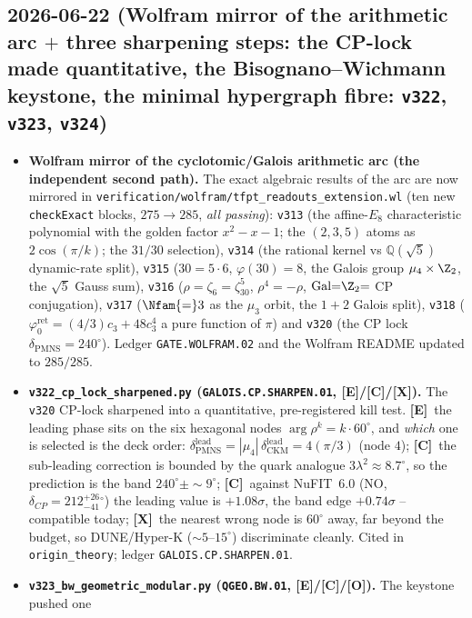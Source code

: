 \documentclass[11pt]{article}
\providecommand{\mE}{\textbf{[E]}}\providecommand{\mC}{\textbf{[C]}}
\providecommand{\mO}{\textbf{[O]}}\providecommand{\mX}{\textbf{[X]}}
\providecommand{\cthree}{c_3}\providecommand{\phiz}{\varphi_0^{\mathrm{ret}}}
\begin{document}
\subsection*{2026-06-22 (Wolfram mirror of the arithmetic arc $+$ three sharpening steps: the CP-lock made quantitative, the Bisognano--Wichmann keystone, the minimal hypergraph fibre: \texttt{v322}, \texttt{v323}, \texttt{v324})}
\begin{itemize}
\item \textbf{Wolfram mirror of the cyclotomic/Galois arithmetic arc (the independent second path).} The exact
  algebraic results of the arc are now mirrored in \texttt{verification/wolfram/tfpt\_readouts\_extension.wl} (ten new
  \texttt{checkExact} blocks, $275\to285$, \emph{all passing}): \texttt{v313} (the affine-$E_8$ characteristic
  polynomial with the golden factor $x^2{-}x{-}1$; the $(2,3,5)$ atoms as
  $2\cos(\pi/k)$; the $31/30$ selection), \texttt{v314} (the rational kernel vs $\mathbb Q(\sqrt5)$
  dynamic-rate split), \texttt{v315} ($30{=}5{\cdot}6$, $\varphi(30){=}8$, the Galois group $\mu_4\times\Z_2$, the
  $\sqrt5$ Gauss sum), \texttt{v316} ($\rho{=}\zeta_6{=}\zeta_{30}^5$, $\rho^4{=}-\rho$, $\mathrm{Gal}{=}\Z_2{=}$ CP
  conjugation), \texttt{v317} ($\Nfam{=}3$ as the $\mu_3$ orbit, the $1{+}2$ Galois split), \texttt{v318}
  ($\phiz{=}(4/3)\cthree{+}48\cthree^4$ a pure function of $\pi$) and \texttt{v320} (the CP lock
  $\delta_{\mathrm{PMNS}}{=}240^\circ$). Ledger \texttt{GATE.WOLFRAM.02} and the Wolfram README updated to $285/285$.
\item \textbf{\texttt{v322\_cp\_lock\_sharpened.py} (\texttt{GALOIS.CP.SHARPEN.01}, \mE/\mC/\mX).} The \texttt{v320}
  CP-lock sharpened into a quantitative, pre-registered kill test. \mE\ the leading phase sits on the six hexagonal
  nodes $\arg\rho^k{=}k\cdot60^\circ$, and \emph{which} one is selected is the deck order:
  $\delta_{\mathrm{PMNS}}^{\mathrm{lead}}{=}|\mu_4|\,\delta_{\mathrm{CKM}}^{\mathrm{lead}}{=}4(\pi/3)$ (node $4$);
  \mC\ the sub-leading correction is bounded by the quark analogue $3\lambda^2\approx8.7^\circ$, so the prediction is
  the band $240^\circ\pm\sim9^\circ$; \mC\ against NuFIT~6.0 (NO, $\delta_{CP}{=}212^{+26}_{-41}{}^\circ$) the leading
  value is $+1.08\sigma$, the band edge $+0.74\sigma$ -- compatible today; \mX\ the nearest wrong node is $60^\circ$
  away, far beyond the budget, so DUNE/Hyper-K ($\sim5$--$15^\circ$) discriminate cleanly. Cited in
  \texttt{origin\_theory}; ledger \texttt{GALOIS.CP.SHARPEN.01}.
\item \textbf{\texttt{v323\_bw\_geometric\_modular.py} (\texttt{QGEO.BW.01}, \mE/\mC/\mO).} The keystone pushed one

\end{itemize}
\end{document}
